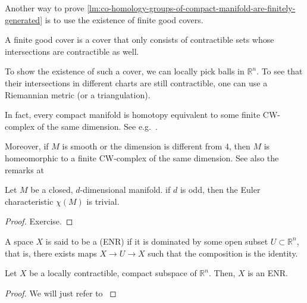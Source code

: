 
\begin{remark}
  Another way to prove
  \autoref{lm:co-homology-groups-of-compact-manifold-are-finitely-generated}
  is to use the existence of finite good covers.

  A finite good cover is a cover that only consists of contractible sets
  whose intersections are contractible as well.

  To show the existence of such a cover, we can locally pick balls in $\mathbb{R}^n$.
  To see that their intersections in different charts are still contractible,
  one can use a Riemannian metric (or a triangulation).
\end{remark}

\begin{remark}
  In fact, every compact manifold is homotopy equivalent to
  some finite CW-complex of the same dimension.
  See e.g.~\cite[Cor.~A.11]{hatcher-2001}.

  Moreover, if $M$ is smooth or the dimension is different from  $4$,
  then $M$ is homeomorphic to a finite CW-complex of the same dimension.
  See also the remarks at \cite[p.528f]{hatcher-2001}
\end{remark}

\begin{theorem}
  Let $M$ be a closed,  $d$-dimensional manifold.
  if  $d$ is odd, then the Euler characteristic  $\chi(M)$ is trivial.
\end{theorem}

\begin{proof}
  Exercise.
\end{proof}

\begin{definition}
  \label{def:euclidean-neighborhood-retract}
  A space $X$ is said to be a  (ENR)
  if it is dominated by some open subset $U\subset \mathbb{R}^n$, that is,
  there exists maps $X \to U \to X$ such that the composition is the identity.
\end{definition}

\begin{proposition}
  \label{prop:locally-contractible-compact-subspace-of-r-n-is-enr}
  Let $X$ be a locally contractible, compact subspace of  $\mathbb{R}^n$.
  Then, $X$ is an ENR.
\end{proposition}
\begin{proof}
  We will just refer to \cite[Thm~A.7]{hatcher-2001}
\end{proof}


